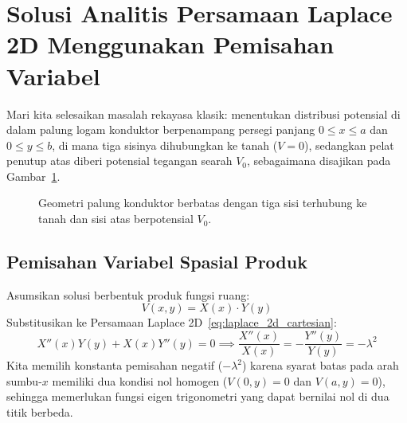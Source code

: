 \documentclass[11pt,a4paper]{article}
\theoremstyle{definition}
\begin{document}
\section{Solusi Analitis Persamaan Laplace 2D Menggunakan Pemisahan Variabel}

Mari kita selesaikan masalah rekayasa klasik: menentukan distribusi potensial di dalam palung logam konduktor berpenampang persegi panjang $0 \le x \le a$ dan $0 \le y \le b$, di mana tiga sisinya dihubungkan ke tanah ($V = 0$), sedangkan pelat penutup atas diberi potensial tegangan searah $V_0$, sebagaimana disajikan pada Gambar~\ref{fig:laplace_box_geometry}.

\begin{figure}[htbp]
\centering
{}
\caption{Geometri palung konduktor berbatas dengan tiga sisi terhubung ke tanah dan sisi atas berpotensial $V_0$.}
\label{fig:laplace_box_geometry}
\end{figure}

\subsection{Pemisahan Variabel Spasial Produk}
Asumsikan solusi berbentuk produk fungsi ruang:
\begin{equation}
    V(x, y) = X(x) \cdot Y(y)
\end{equation}
Substitusikan ke Persamaan Laplace 2D~\eqref{eq:laplace_2d_cartesian}:
\begin{equation}
    X''(x) Y(y) + X(x) Y''(y) = 0 \implies \frac{X''(x)}{X(x)} = -\frac{Y''(y)}{Y(y)} = -\lambda^2
\end{equation}
Kita memilih konstanta pemisahan negatif ($-\lambda^2$) karena syarat batas pada arah sumbu-$x$ memiliki dua kondisi nol homogen ($V(0, y) = 0$ dan $V(a, y) = 0$), sehingga memerlukan fungsi eigen trigonometri yang dapat bernilai nol di dua titik berbeda.
\end{document}
